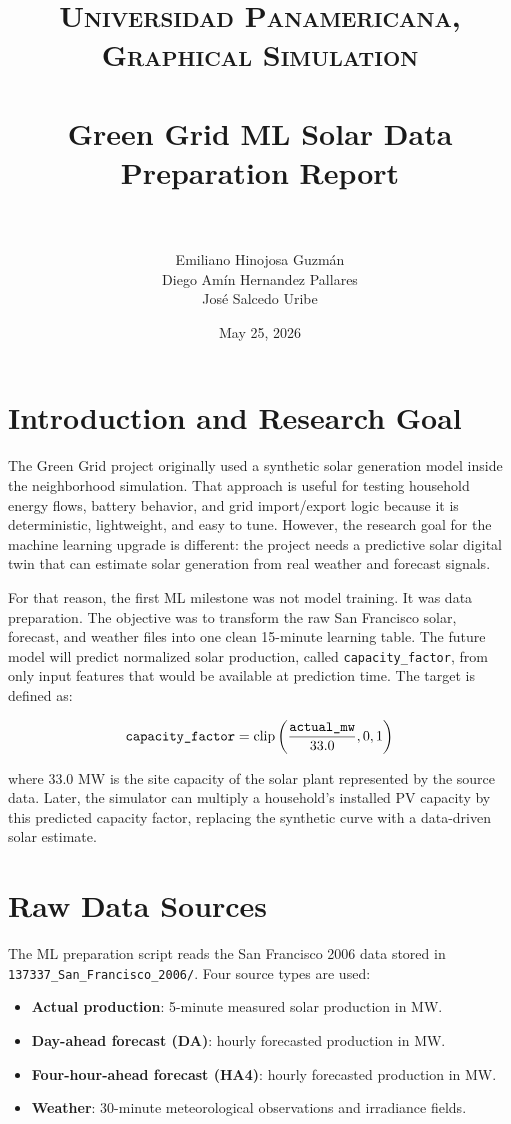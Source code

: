 \documentclass[paper=a4, fontsize=11pt]{scrartcl}
\title{
\normalfont \normalsize
\textsc{Universidad Panamericana, Graphical Simulation} \\ [25pt]
\horrule{0.5pt} \\[0.4cm]
\huge Green Grid ML Solar Data Preparation Report \\
\horrule{2pt} \\[0.5cm]
}
\author{Emiliano Hinojosa Guzm\'an \\ Diego Am\'in Hernandez Pallares \\ Jos\'e Salcedo Uribe}
\date{\normalsize May 25, 2026}
\numberwithin{table}{section}
\begin{document}
\maketitle

\section{Introduction and Research Goal}

The Green Grid project originally used a synthetic solar generation model inside
the neighborhood simulation. That approach is useful for testing household
energy flows, battery behavior, and grid import/export logic because it is
deterministic, lightweight, and easy to tune. However, the research goal for the
machine learning upgrade is different: the project needs a predictive solar
digital twin that can estimate solar generation from real weather and forecast
signals.

For that reason, the first ML milestone was not model training. It was data
preparation. The objective was to transform the raw San Francisco solar,
forecast, and weather files into one clean 15-minute learning table. The future
model will predict normalized solar production, called \texttt{capacity\_factor},
from only input features that would be available at prediction time. The target
is defined as:

\begin{equation}
\text{\texttt{capacity\_factor}} =
\operatorname{clip}\left(\frac{\text{\texttt{actual\_mw}}}{33.0}, 0, 1\right)
\end{equation}

where 33.0 MW is the site capacity of the solar plant represented by the source
data. Later, the simulator can multiply a household's installed PV capacity by
this predicted capacity factor, replacing the synthetic curve with a
data-driven solar estimate.

\section{Raw Data Sources}

The ML preparation script reads the San Francisco 2006 data stored in
\texttt{137337\_San\_Francisco\_2006/}. Four source types are used:

\begin{itemize}
    \item \textbf{Actual production}: 5-minute measured solar production in MW.
    \item \textbf{Day-ahead forecast (DA)}: hourly forecasted production in MW.
    \item \textbf{Four-hour-ahead forecast (HA4)}: hourly forecasted production in MW.
    \item \textbf{Weather}: 30-minute meteorological observations and irradiance fields.
\end{itemize}
\end{document}

